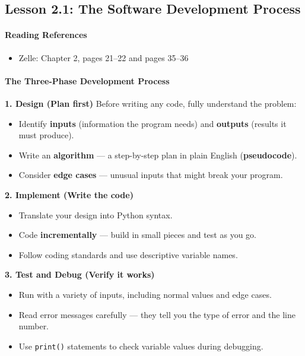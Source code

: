 \documentclass[
  justified,
  openright,
]{tufte-book}
\let\subsubsection\paragraph
\let\paragraph\paragraph
\let\subsubsection\paragraph
\let\paragraph\paragraph
\providecommand{\tightlist}{%
  \setlength{\itemsep}{0pt}\setlength{\parskip}{0pt}}
\begin{document}
\subsection{Lesson 2.1: The Software Development
Process}\label{lesson-2.1-the-software-development-process-1}

\subsubsection{Reading References}\label{reading-references-7}

\begin{itemize}
\tightlist
\item
  Zelle: Chapter 2, pages 21--22 and pages 35--36
\end{itemize}

\subsubsection{The Three-Phase Development
Process}\label{the-three-phase-development-process}

\textbf{1. Design (Plan first)} Before writing any code, fully
understand the problem:

\begin{itemize}
\tightlist
\item
  Identify \textbf{inputs} (information the program needs) and
  \textbf{outputs} (results it must produce).
\item
  Write an \textbf{algorithm} --- a step-by-step plan in plain English
  (\textbf{pseudocode}).
\item
  Consider \textbf{edge cases} --- unusual inputs that might break your
  program.
\end{itemize}

\textbf{2. Implement (Write the code)}

\begin{itemize}
\tightlist
\item
  Translate your design into Python syntax.
\item
  Code \textbf{incrementally} --- build in small pieces and test as you
  go.
\item
  Follow coding standards and use descriptive variable names.
\end{itemize}

\textbf{3. Test and Debug (Verify it works)}

\begin{itemize}
\tightlist
\item
  Run with a variety of inputs, including normal values and edge cases.
\item
  Read error messages carefully --- they tell you the type of error and
  the line number.
\item
  Use \texttt{print()} statements to check variable values during
  debugging.
\end{itemize}
\end{document}
